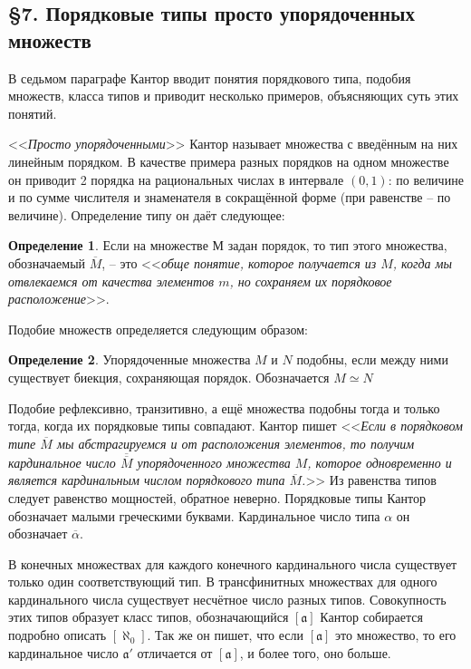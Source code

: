 \documentclass[a4paper,12pt]{extarticle}
\theoremstyle{definition}
\newtheorem{definition}{Определение}
\newcommand{\cit}[1]{<<\textit{#1}>>}
\newcommand{\car}[1]{\overline{\overline{#1}}}
\begin{document}
\subsection{\S 7. Порядковые типы просто упорядоченных множеств}
В седьмом параграфе Кантор вводит понятия порядкового типа, подобия множеств, класса типов и приводит несколько примеров, объясняющих суть этих понятий.

\cit{Просто упорядоченными} Кантор называет множества с введённым на них линейным порядком.
В качестве примера разных порядков на одном множестве он приводит 2 порядка на рациональных числах в интервале $(0, 1)$:
по величине и по сумме числителя и знаменателя в сокращённой форме (при равенстве -- по величине).
Определение типу он даёт следующее:
\begin{definition}
    Если на множестве $М$ задан порядок, то тип этого множества, обозначаемый $\overline{M}$, -- это 
    \cit{обще понятие, которое получается из $M$, когда мы отвлекаемся от качества элементов $m$, но сохраняем их порядковое расположение}.
\end{definition}
Подобие множеств определяется следующим образом:
\begin{definition}
    Упорядоченные множества $M$ и $N$ подобны, если между ними существует биекция, сохраняющая порядок. Обозначается $M \simeq N$
\end{definition}
Подобие рефлексивно, транзитивно, а ещё множества подобны тогда и только тогда, когда их порядковые типы совпадают.
Кантор пишет \cit{Если в порядковом типе $\overline{M}$ мы абстрагируемся и от расположения элементов,
то получим кардинальное число $\car{M}$ упорядоченного множества $M$, которое одновременно и является кардинальным числом порядкового типа $\overline{M}$.}
Из равенства типов следует равенство мощностей, обратное неверно.
Порядковые типы Кантор обозначает малыми греческими буквами.
Кардинальное число типа $\alpha$ он обозначает $\overline{\alpha}$.

В конечных множествах для каждого конечного кардинального числа существует только один соответствующий тип.
В трансфинитных множествах для одного кардинального числа существует несчётное число разных типов.
Совокупность этих типов образует класс типов, обозначающийся $[\mathfrak{a}]$
Кантор собирается подробно описать $[\aleph_0]$.
Так же он пишет, что если $[\mathfrak{a}]$ это множество, то его кардинальное число $\mathfrak{a'}$ отличается от $[\mathfrak{a}]$, и более того, оно больше.
\end{document}
